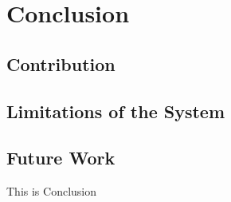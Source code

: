 \chapter{Conclusion}
\section{Contribution}
\section{Limitations of the System}
\section{Future Work}
This is Conclusion